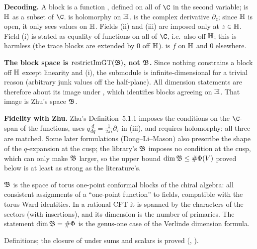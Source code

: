 \begin{dictionary}
\textbf{Decoding.} A block is a function , defined on all of $\C$ in the second variable;
 is $\mathbb{H}$ as a subset of $\C$.  is holomorphy on $\mathbb{H}$.
 is the complex derivative $\partial_z$; since $\mathbb{H}$ is open, it only sees values on
$\mathbb{H}$. Fields (ii) and (iii) are imposed only at $z\in\mathbb{H}$. Field (i) is stated as equality of functions on
all of $\C$, i.e.\ also off $\mathbb{H}$; this is harmless (the trace blocks are extended by $0$ off $\mathbb{H}$).
 is $f$ on $\mathbb{H}$ and $0$ elsewhere.

\textbf{The block space is $\mathrm{restrictImGT}(\mathfrak{B})$, not $\mathfrak{B}$.} Since nothing constrains a block off
$\mathbb{H}$ except linearity and (i), the submodule  is infinite-dimensional for a trivial reason
(arbitrary junk values off the half-plane). All dimension statements are therefore about its image under
, which identifies blocks agreeing on $\mathbb{H}$. That image is Zhu's space $\mathfrak{B}$.

\textbf{Fidelity with Zhu.} Zhu's Definition~5.1.1 imposes the conditions on the $\C$-span of the functions, uses
$q\frac{d}{dq}=\frac1{2\pi i}\partial_\tau$ in (iii), and requires holomorphy; all three are matched. Some later formulations (Dong--Li--Mason) also prescribe the shape of the
$q$-expansion at the cusp; the library's $\mathfrak{B}$ imposes no condition at the cusp, which can only make $\mathfrak{B}$
larger, so the upper bound $\dim\mathfrak{B}\le\#\Phi(V)$ proved below is at least as strong as the literature's.
\end{dictionary}

\begin{physics}
$\mathfrak{B}$ is the space of torus one-point conformal blocks of the chiral algebra: all consistent assignments of a
``one-point function'' to fields, compatible with the torus Ward identities. In a rational CFT it is spanned by the
characters of the sectors (with insertions), and its dimension is the number of primaries. The statement $\dim\mathfrak{B}=\#\Phi$
is the genus-one case of the Verlinde dimension formula.
\end{physics}

\begin{status}
Definitions; the closure of  under sums and scalars is proved (,
).
\end{status}

